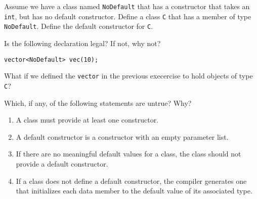 %
%
\begin{question}
Assume we have a class named \verb|NoDefault| that has a
constructor that takes an \verb|int|, but has no default constructor. Define a class
\verb|C| that has a member of type \verb|NoDefault|. Define the default constructor for \verb|C|.
\end{question}

\begin{question}
Is the following declaration legal? If not, why not?
\begin{lstlisting}
vector<NoDefault> vec(10);
\end{lstlisting}
\end{question}

\begin{question}
What if we defined the \verb|vector| in the previous execercise to
hold objects of type \verb|C|?
\end{question}

\begin{question}
Which, if any, of the following statements are untrue? Why?
\begin{enumerate}[label=(\alph*)]
^^I\item A class must provide at least one constructor.
^^I\item A default constructor is a constructor with an empty parameter list.
^^I\item If there are no meaningful default values for a class, the class should not
provide a default constructor.
^^I\item If a class does not define a default constructor, the compiler generates
one that initializes each data member to the default value of its associated
type.
\end{enumerate}
\end{question}
